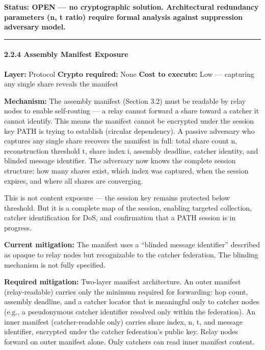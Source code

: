 \documentclass[
  11pt,
]{article}
\begin{document}
\textbf{Status: OPEN --- no cryptographic solution. Architectural
redundancy parameters (n, t ratio) require formal analysis against
suppression adversary model.}

\begin{center}\rule{0.5\linewidth}{0.5pt}\end{center}

\hypertarget{assembly-manifest-exposure}{%
\paragraph{2.2.4 Assembly Manifest
Exposure}\label{assembly-manifest-exposure}}

\textbf{Layer:} Protocol \textbf{Crypto required:} None \textbf{Cost to
execute:} Low --- capturing any single share reveals the manifest

\textbf{Mechanism:} The assembly manifest (Section 3.2) must be readable
by relay nodes to enable self-routing --- a relay cannot forward a share
toward a catcher it cannot identify. This means the manifest cannot be
encrypted under the session key PATH is trying to establish (circular
dependency). A passive adversary who captures any single share recovers
the manifest in full: total share count n, reconstruction threshold t,
share index i, assembly deadline, catcher identity, and blinded message
identifier. The adversary now knows the complete session structure: how
many shares exist, which index was captured, when the session expires,
and where all shares are converging.

This is not content exposure --- the session key remains protected below
threshold. But it is a complete map of the session, enabling targeted
collection, catcher identification for DoS, and confirmation that a PATH
session is in progress.

\textbf{Current mitigation:} The manifest uses a ``blinded message
identifier'' described as opaque to relay nodes but recognizable to the
catcher federation. The blinding mechanism is not fully specified.

\textbf{Required mitigation:} Two-layer manifest architecture. An outer
manifest (relay-readable) carries only the minimum required for
forwarding: hop count, assembly deadline, and a catcher locator that is
meaningful only to catcher nodes (e.g., a pseudonymous catcher
identifier resolved only within the federation). An inner manifest
(catcher-readable only) carries share index, n, t, and message
identifier, encrypted under the catcher federation's public key. Relay
nodes forward on outer manifest alone. Only catchers can read inner
manifest content.
\end{document}
